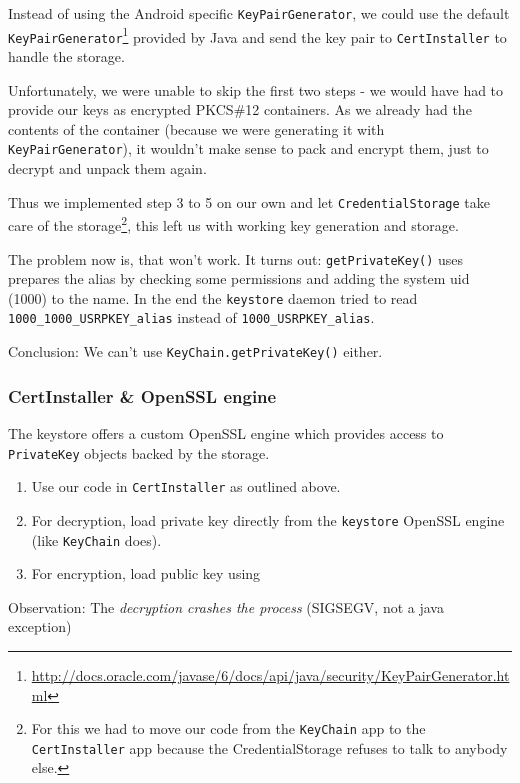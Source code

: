 \documentclass[a4paper,draft]{scrartcl}
\begin{document}
			Instead of using the Android specific \texttt{KeyPairGenerator}, we could use the default \texttt{KeyPairGenerator}\footnote{\url{http://docs.oracle.com/javase/6/docs/api/java/security/KeyPairGenerator.html}} provided by Java and send the key pair to \texttt{CertInstaller} to handle the storage.
			
			Unfortunately, we were unable to skip the first two steps - we would have had to provide our keys as encrypted PKCS\#12 containers. As we already had the contents of the container (because we were generating it with \texttt{KeyPairGenerator}), it wouldn't make sense to pack and encrypt them, just to decrypt and unpack them again.
			
			Thus we implemented step 3 to 5 on our own and let \texttt{CredentialStorage} take care of the storage\footnote{For this we had to move our code from the \texttt{KeyChain} app to the \texttt{CertInstaller} app because the CredentialStorage refuses to talk to anybody else.}, this left us with working key generation and storage.
			
			The problem now is, that  won't work. It turns out: \texttt{getPrivateKey()} uses prepares the alias by checking some permissions and adding the system uid (1000) to the name. In the end the \texttt{keystore} daemon tried to read \texttt{1000\_1000\_USRPKEY\_alias} instead of \texttt{1000\_USRPKEY\_alias}.

			Conclusion: We can't use \texttt{KeyChain.getPrivateKey()} either.

		\pagebreak[4]
		\subsubsection{CertInstaller \& OpenSSL engine}
			The keystore offers a custom OpenSSL engine which provides access to \texttt{PrivateKey} objects backed by the storage.

			\begin{enumerate}
				\item Use our code in \texttt{CertInstaller} as outlined above.
				\item For decryption, load private key directly from the \texttt{keystore} OpenSSL engine (like \texttt{KeyChain} does).
				\item For encryption, load public key using 
			\end{enumerate}

			Observation:
			The \emph{decryption crashes the process} (SIGSEGV, not a java exception)
\end{document}
